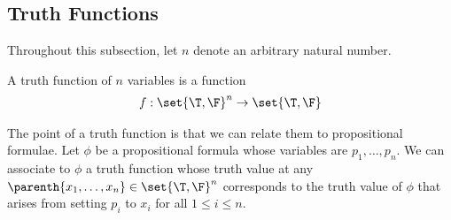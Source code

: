 \subsection{Truth Functions}

Throughout this subsection, let $n$ denote an arbitrary natural number.

\begin{boxdefinition}
    A truth function of $n$ variables is a function
    \begin{align*}
        f : \set{\T, \F}^n \to \set{\T, \F}
    \end{align*}
\end{boxdefinition}

The point of a truth function is that we can relate them to propositional formulae. Let $\phi$ be a propositional formula whose variables are $p_1, \ldots, p_n$. We can associate to $\phi$ a truth function whose truth value at any $\parenth{x_1, \ldots, x_n} \in \set{\T, \F}^n$ corresponds to the truth value of $\phi$ that arises from setting $p_i$ to $x_i$ for all $1 \leq i \leq n$. 
